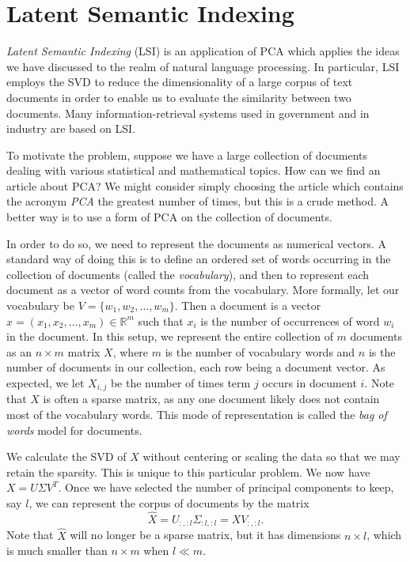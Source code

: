 \section*{Latent Semantic Indexing}
\emph{Latent Semantic Indexing} (LSI) is an application of PCA which applies the ideas we have discussed to the realm of natural language processing.
In particular, LSI employs the SVD to reduce the dimensionality of a large corpus of text documents in order to enable us to evaluate the similarity between two documents.
Many information-retrieval systems used in government and in industry are based on LSI.

To motivate the problem, suppose we have a large collection of documents dealing with various statistical and mathematical topics.
How can we find an article about PCA?
We might consider simply choosing the article which contains the acronym \emph{PCA} the greatest number of times, but this is a crude method.
A better way is to use a form of PCA on the collection of documents.

In order to do so, we need to represent the documents as numerical vectors.
A standard way of doing this is to define an ordered set of words occurring in the collection of documents (called the \emph{vocabulary}), and then to
represent each document as a vector of word counts from the vocabulary.
More formally, let our vocabulary be $V = \{w_1,w_2,\ldots,w_m\}$.
Then a document is a vector $x  = (x_1,x_2,\ldots,x_m) \in \mathbb{R}^m$ such that $x_i$ is the number of occurrences of word $w_i$ in the document.
In this setup, we represent the entire collection of $m$ documents as an $n \times m$ matrix $X$, where $m$ is the number of vocabulary words and $n$ is the number of documents in our collection, each row being a document vector.
As expected, we let $X_{i,j}$ be the number of times term $j$ occurs in document $i$.
Note that $X$ is often a sparse matrix, as any one document likely does not contain most of the vocabulary words.
This mode of representation is called the \emph{bag of words} model for documents.

We calculate the SVD of $X$ without centering or scaling the data so that we may retain the sparsity. This is unique to this particular problem.
We now have $X = U\Sigma V^T$. Once we have selected the number of principal components to keep, say $l$, we can represent the corpus of documents by the matrix
\[
\widehat{X} = U_{:,:l}\Sigma_{:l,:l} = XV_{:,:l}.
\]
Note that $\widehat{X}$ will no longer be a sparse matrix, but it has dimensions $n \times l$, which is much smaller than $n \times m$ when $l \ll m$.

